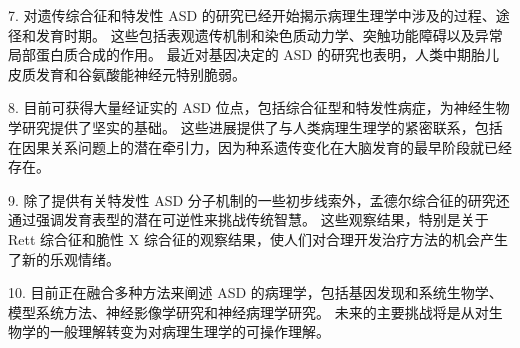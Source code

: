 7. 对遗传综合征和特发性 ASD 的研究已经开始揭示病理生理学中涉及的过程、途径和发育时期。 这些包括表观遗传机制和染色质动力学、突触功能障碍以及异常局部蛋白质合成的作用。 最近对基因决定的 ASD 的研究也表明，人类中期胎儿皮质发育和谷氨酸能神经元特别脆弱。 

8. 目前可获得大量经证实的 ASD 位点，包括综合征型和特发性病症，为神经生物学研究提供了坚实的基础。 这些进展提供了与人类病理生理学的紧密联系，包括在因果关系问题上的潜在牵引力，因为种系遗传变化在大脑发育的最早阶段就已经存在。 

9. 除了提供有关特发性 ASD 分子机制的一些初步线索外，孟德尔综合征的研究还通过强调发育表型的潜在可逆性来挑战传统智慧。 这些观察结果，特别是关于 Rett 综合征和脆性 X 综合征的观察结果，使人们对合理开发治疗方法的机会产生了新的乐观情绪。 

10. 目前正在融合多种方法来阐述 ASD 的病理学，包括基因发现和系统生物学、模型系统方法、神经影像学研究和神经病理学研究。 未来的主要挑战将是从对生物学的一般理解转变为对病理生理学的可操作理解。

